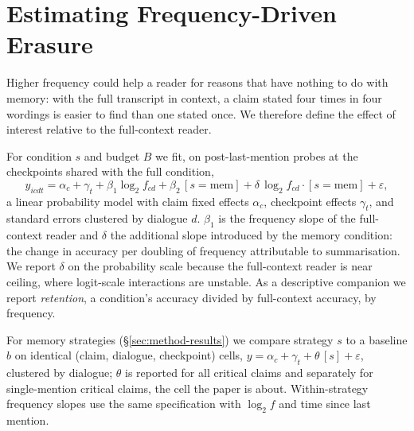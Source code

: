 \section{Estimating Frequency-Driven Erasure}
\label{sec:analysis}

Higher frequency could help a reader for reasons that have nothing to do with memory: with the full transcript in context, a claim stated four times in four wordings is easier to find than one stated once.
We therefore define the effect of interest relative to the full-context reader.

For condition $s$ and budget $B$ we fit, on post-last-mention probes at the checkpoints shared with the full condition,
\begin{equation}
y_{icdt} = \alpha_c + \gamma_t + \beta_1 \log_2 f_{cd} + \beta_2 \,[s{=}\mathrm{mem}] + \delta \,\log_2 f_{cd}\cdot[s{=}\mathrm{mem}] + \varepsilon,
\label{eq:did}
\end{equation}
a linear probability model with claim fixed effects $\alpha_c$, checkpoint effects $\gamma_t$, and standard errors clustered by dialogue $d$.
$\beta_1$ is the frequency slope of the full-context reader and $\delta$ the additional slope introduced by the memory condition: the change in accuracy per doubling of frequency attributable to summarisation.
We report $\delta$ on the probability scale because the full-context reader is near ceiling, where logit-scale interactions are unstable.
As a descriptive companion we report \emph{retention}, a condition's accuracy divided by full-context accuracy, by frequency.

For memory strategies (\S\ref{sec:method-results}) we compare strategy $s$ to a baseline $b$ on identical (claim, dialogue, checkpoint) cells,
$y = \alpha_c + \gamma_t + \theta\,[s] + \varepsilon$, clustered by dialogue; $\theta$ is reported for all critical claims and separately for single-mention critical claims, the cell the paper is about.
Within-strategy frequency slopes use the same specification with $\log_2 f$ and time since last mention.
